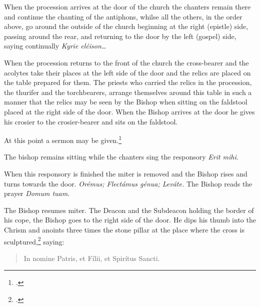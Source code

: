 \documentclass[letterpaper]{report}
\newcommand\src{\textsc{S.R.C.}}
\begin{document}
{    When the procession arrives at the door of the church the chanters remain
    there and continue the chanting of the antiphons, whilse all the others, in
    the order above, go around the outside of the church beginning at the right
    (epistle) side, passing around the rear, and returning to the door by the
    left (gospel) side, saying continually \textit{Kyrie eléison\dots}

    \rubric When the procession returns to the front of the church the
    cross-bearer and the acolytes take their places at the left side of the
    door and the relics are placed on the table prepared for them. The priests
    who carried the relics in the procession, the thurifer and the
    torchbearers, arrange themselves around this table in such a manner that
    the relics may be seen by the Bishop when sitting on the faldstool placed
    at the right side of the door. When the Bishop arrives at the door he gives
    his crosier to the crosier-bearer and sits on the faldstool.

    \rubric At this point a sermon may be given.\footcite[The exhortation
    here spoken of, the decrees of the Council of Trent which according to the
    Pontifical are now read by the archdeacon (any priest), the address of the
    Bishop to the founder of the church and the latter's reply may be omitted.
    --- \src, May 17, 1890, n. 3729 ad VIII.][footnote 2, p. 82.]{consecranda}

    \rubric The bishop remains sitting while the chanters sing the responsory
    \textit{Erit mihi.}

    \rubric When this responsory is finished the miter is removed and the
    Bishop rises and turns towards the door. \textit{Orémus; Flectámus génua;
    Leváte.} The Bishop reads the prayer \textit{Domum tuam.}

    \rubric The Bishop resumes miter. The Deacon and the Subdeacon holding the
    border of his cope, the Bishop goes to the right side of the door. He dips
    his thumb into the Chrism and anoints three times the stone pillar at the
    place where the cross is sculptured,\footcite[The Pontifical says
    ''\textit{signat ostium,''} which the \src, Aug. 7, 1875, n. 3364 ad VI,
    interprets to mean the two stone or brick pillars at the sides of the
    door.][footnote 1, p. 83.]{consecranda} saying:

    \begin{quote}
       In nomine Pa\cross tris, et Fí\cross lii, et Spirítus \cross Sancti.
    \end{quote}

}
\end{document}

